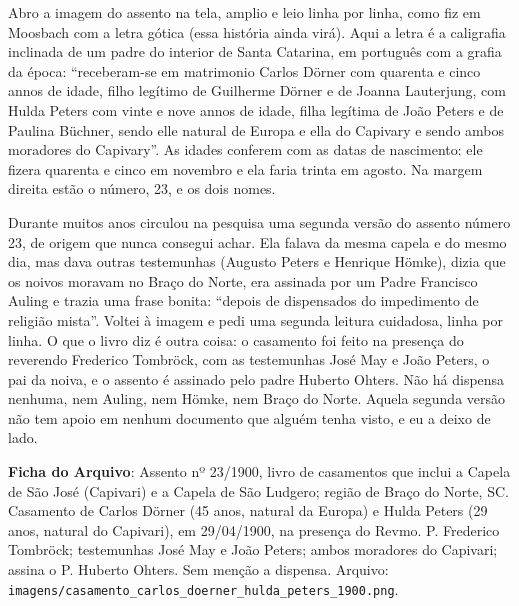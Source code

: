 \documentclass[
  brazilian,
  11pt,
  openany]{book}
\begin{document}
Abro a imagem do assento na tela, amplio e leio linha por linha, como
fiz em Moosbach com a letra gótica (essa história ainda virá). Aqui a
letra é a caligrafia inclinada de um padre do interior de Santa
Catarina, em português com a grafia da época: ``receberam-se em
matrimonio Carlos Dörner com quarenta e cinco annos de idade, filho
legítimo de Guilherme Dörner e de Joanna Lauterjung, com Hulda Peters
com vinte e nove annos de idade, filha legítima de João Peters e de
Paulina Büchner, sendo elle natural de Europa e ella do Capivary e sendo
ambos moradores do Capivary''. As idades conferem com as datas de
nascimento: ele fizera quarenta e cinco em novembro e ela faria trinta
em agosto. Na margem direita estão o número, 23, e os dois nomes.

Durante muitos anos circulou na pesquisa uma segunda versão do assento
número 23, de origem que nunca consegui achar. Ela falava da mesma
capela e do mesmo dia, mas dava outras testemunhas (Augusto Peters e
Henrique Hömke), dizia que os noivos moravam no Braço do Norte, era
assinada por um Padre Francisco Auling e trazia uma frase bonita:
``depois de dispensados do impedimento de religião mista''. Voltei à
imagem e pedi uma segunda leitura cuidadosa, linha por linha. O que o
livro diz é outra coisa: o casamento foi feito na presença do reverendo
Frederico Tombröck, com as testemunhas José May e João Peters, o pai da
noiva, e o assento é assinado pelo padre Huberto Ohters. Não há dispensa
nenhuma, nem Auling, nem Hömke, nem Braço do Norte. Aquela segunda
versão não tem apoio em nenhum documento que alguém tenha visto, e eu a
deixo de lado.

\begin{ficha}

\textbf{Ficha do Arquivo}: Assento nº 23/1900, livro de casamentos que
inclui a Capela de São José (Capivari) e a Capela de São Ludgero; região
de Braço do Norte, SC. Casamento de Carlos Dörner (45 anos, natural da
Europa) e Hulda Peters (29 anos, natural do Capivari), em 29/04/1900, na
presença do Revmo. P. Frederico Tombröck; testemunhas José May e João
Peters; ambos moradores do Capivari; assina o P. Huberto Ohters. Sem
menção a dispensa. Arquivo:
\texttt{imagens/casamento\_carlos\_doerner\_hulda\_peters\_1900.png}.

\end{ficha}
\end{document}
